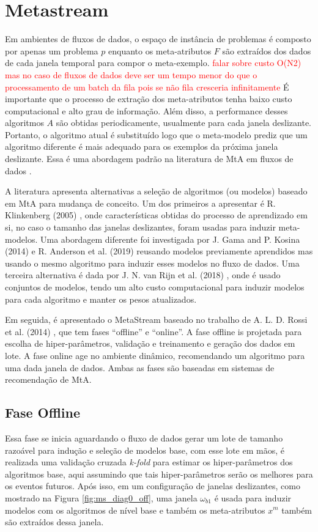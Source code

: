 \section{Metastream}
\label{sec:metastream}

Em ambientes de fluxos de dados, o espaço de instância de problemas é composto
por apenas um problema $p$ enquanto os meta-atributos $F$ são extraídos dos
dados de cada janela temporal para compor o meta-exemplo.
\textcolor{red}{falar sobre custo O(N2) mas no caso de fluxos de dados deve ser
um tempo menor do que o processamento de um batch da fila pois se não fila
cresceria infinitamente}
É importante que o processo de extração dos meta-atributos tenha baixo custo
computacional e alto grau de informação.
Além disso, a  performance desses algoritmos $A$ são obtidas periodicamente,
usualmente para cada janela deslizante. Portanto, o algoritmo atual é substituído logo que o meta-modelo prediz que um
algoritmo diferente é mais adequado para os exemplos da próxima janela
deslizante. Essa é uma abordagem padrão na literatura de MtA em fluxos de dados
\cite{read2012batch, vanrijn2014algorithm, Anderson2019}.

A literatura apresenta alternativas a seleção de algoritmos (ou modelos)
baseado em MtA para mudança de conceito. Um dos primeiros a apresentar é R.
Klinkenberg (2005) \cite{klinkenberg2005}, onde características obtidas do
processo de aprendizado em si, no caso o tamanho das janelas deslizantes, foram
usadas para induzir meta-modelos.
Uma abordagem diferente foi investigada por J. Gama and P. Kosina (2014)
\cite{gama2014} e R. Anderson et al. (2019) \cite{Anderson2019}
reusando modelos previamente aprendidos mas usando o mesmo algoritmo para
induzir esses modelos no fluxo de dados. Uma terceira alternativa é dada por J.
N. van Rijn et al. (2018) \cite{VanRijn2018}, onde é usado conjuntos de
modelos, tendo um alto custo computacional para induzir modelos para cada
algoritmo e manter os pesos atualizados.

Em seguida, é apresentado o MetaStream baseado no trabalho de A. L. D. Rossi et
al. (2014) \cite{rossi2014metastream}, que tem fases ``offline'' e ``online''.
A fase offline is projetada para escolha de hiper-parâmetros, validação e
treinamento e geração dos dados em lote. A fase online age no ambiente dinâmico, recomendando um algoritmo para uma dada janela de dados. Ambas as fases são baseadas em sistemas de recomendação de MtA.


\subsection{Fase Offline}
\label{subsec:offline}
Essa fase se inicia aguardando o fluxo de dados gerar um lote de tamanho
razoável para indução e seleção de modelos base, com esse lote em mãos, é
realizada uma validação cruzada \textit{k-fold} para estimar os
hiper-parâmetros dos algoritmos base, aqui assumindo que tais hiper-parâmetros
serão os melhores para os eventos futuros.
Após isso, em um configuração de janelas deslizantes, como mostrado na Figura
\ref{fig:ms_diag0_off}, uma janela $\omega_{b1}$ é usada para induzir modelos
com os algoritmos de nível base e também os meta-atributos $x^m$ também são
extraídos dessa janela.


